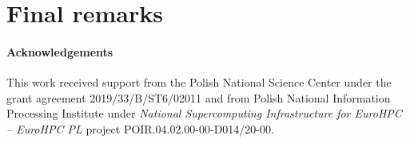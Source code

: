 \documentclass[a4paper,11pt]{article}
\begin{document}
\section{Final remarks}


\paragraph{Acknowledgements}
This work received support from the Polish National Science Center under the grant agreement 2019/33/B/ST6/02011 and from Polish National Information Processing Institute  under \emph{National Supercomputing Infrastructure for EuroHPC -- EuroHPC PL} project POIR.04.02.00-00-D014/20-00.



\end{document}

